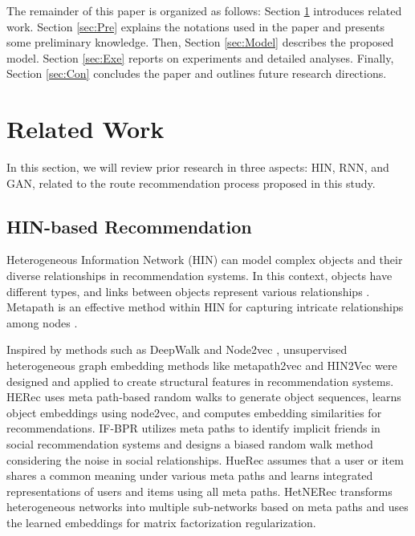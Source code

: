 \documentclass[]{article}
\begin{document}
The remainder of this paper is organized as follows: Section \ref{sec:Rel} introduces related work. Section \ref{sec:Pre} explains the notations used in the paper and presents some preliminary knowledge. Then, Section \ref{sec:Model} describes the proposed model. Section \ref{sec:Exe} reports on experiments and detailed analyses. Finally, Section \ref{sec:Con} concludes the paper and outlines future research directions.



\section{Related Work}
\label{sec:Rel}
In this section, we will review prior research in three aspects: HIN, RNN, and GAN, related to the route recommendation process proposed in this study.

\subsection{HIN-based Recommendation}
Heterogeneous Information Network (HIN) \cite{7536145} can model complex objects and their diverse relationships in recommendation systems. In this context, objects have different types, and links between objects represent various relationships \cite{10.1145/2481244.2481248}. Metapath is an effective method within HIN for capturing intricate relationships among nodes \cite{Begum2016}. 

Inspired by methods such as DeepWalk \cite{Perozzi2014} and Node2vec \cite{10.1145/2939672.2939754}, unsupervised heterogeneous graph embedding methods like metapath2vec \cite{Dong2017} and HIN2Vec \cite{10.1145/3132847.3132953} were designed and applied to create structural features in recommendation systems. HERec \cite{8355676} uses meta path-based random walks to generate object sequences, learns object embeddings using node2vec, and computes embedding similarities for recommendations. IF-BPR \cite{Yu2018} utilizes meta paths to identify implicit friends in social recommendation systems and designs a biased random walk method considering the noise in social relationships. HueRec  \cite{10.5555/3367471.3367571}assumes that a user or item shares a common meaning under various meta paths and learns integrated representations of users and items using all meta paths. HetNERec \cite{Zhao2020} transforms heterogeneous networks into multiple sub-networks based on meta paths and uses the learned embeddings for matrix factorization regularization. 
\end{document}
